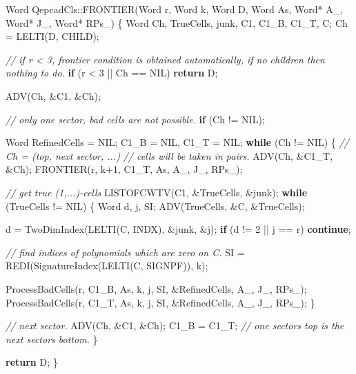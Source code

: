 \documentclass[
]{book}
\newenvironment{Shaded}{\begin{snugshade}}{\end{snugshade}}
\newcommand{\CommentTok}[1]{\textcolor[rgb]{0.56,0.35,0.01}{\textit{#1}}}
\newcommand{\ControlFlowTok}[1]{\textcolor[rgb]{0.13,0.29,0.53}{\textbf{#1}}}
\newcommand{\DecValTok}[1]{\textcolor[rgb]{0.00,0.00,0.81}{#1}}
\newcommand{\NormalTok}[1]{#1}
\theoremstyle{definition}
\theoremstyle{definition}
\theoremstyle{definition}
\theoremstyle{definition}
\theoremstyle{remark}
\begin{document}
\begin{Shaded}
\begin{Highlighting}[numbers=left,,]
\NormalTok{Word QepcadCls::FRONTIER(Word r, Word k, Word D, Word As, Word* A\_, Word* J\_, Word* RPs\_)}
\NormalTok{\{}
\NormalTok{    Word Ch, TrueCells, junk, C1, C1\_B, C1\_T, C;}
\NormalTok{    Ch = LELTI(D, CHILD);}

    \CommentTok{// if r \textless{} 3, frontier condition is obtained automatically, if no children then nothing to do.}
    \ControlFlowTok{if}\NormalTok{ (r \textless{} }\DecValTok{3}\NormalTok{ || Ch == NIL) }\ControlFlowTok{return}\NormalTok{ D;}

\NormalTok{    ADV(Ch, \&C1, \&Ch);}

    \CommentTok{// only one sector, bad cells are not possible.}
    \ControlFlowTok{if}\NormalTok{ (Ch != NIL);}

\NormalTok{    Word RefinedCells = NIL;}
\NormalTok{    C1\_B = NIL, C1\_T = NIL;}
    \ControlFlowTok{while}\NormalTok{ (Ch != NIL) \{}
        \CommentTok{// Ch = (top, next sector, ...)}
        \CommentTok{// cells will be taken in pairs.}
\NormalTok{        ADV(Ch, \&C1\_T, \&Ch);}
\NormalTok{        FRONTIER(r, k+}\DecValTok{1}\NormalTok{, C1\_T, As, A\_, J\_, RPs\_);}

        \CommentTok{// get true (1,...){-}cells}
\NormalTok{        LISTOFCWTV(C1, \&TrueCells, \&junk);}
        \ControlFlowTok{while}\NormalTok{ (TrueCells != NIL) \{}
\NormalTok{            Word d, j, SI;}
\NormalTok{            ADV(TrueCells, \&C, \&TrueCells);}

\NormalTok{            d = TwoDimIndex(LELTI(C, INDX), \&junk, \&j);}
            \ControlFlowTok{if}\NormalTok{ (d != }\DecValTok{2}\NormalTok{ || j == r) }\ControlFlowTok{continue}\NormalTok{;}

            \CommentTok{// find indices of polynomials which are zero on C.}
\NormalTok{            SI = REDI(SignatureIndex(LELTI(C, SIGNPF)), k);}

\NormalTok{            ProcessBadCells(r, C1\_B, As, k, j, SI, \&RefinedCells, A\_, J\_, RPs\_);}
\NormalTok{            ProcessBadCells(r, C1\_T, As, k, j, SI, \&RefinedCells, A\_, J\_, RPs\_);}
\NormalTok{        \}}

        \CommentTok{// next sector.}
\NormalTok{        ADV(Ch, \&C1, \&Ch);}
\NormalTok{        C1\_B = C1\_T; }\CommentTok{// one sector\textquotesingle{}s top is the next sector\textquotesingle{}s bottom.}
\NormalTok{    \}}

    \ControlFlowTok{return}\NormalTok{ D;}
\NormalTok{\}}
\end{Highlighting}
\end{Shaded}
\end{document}
